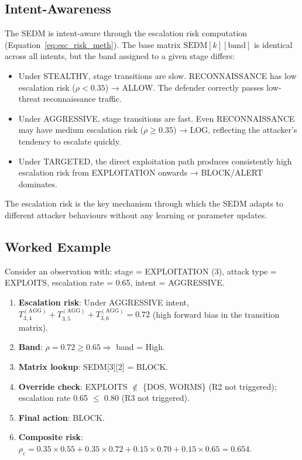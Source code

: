 \subsection{Intent-Awareness}

The SEDM is intent-aware through the escalation risk computation
(Equation~\ref{eq:esc_risk_meth}).
The base matrix $\text{SEDM}[k][\text{band}]$ is identical across all
intents, but the band assigned to a given stage differs:
%
\begin{itemize}
  \item Under STEALTHY, stage transitions are slow.
        RECONNAISSANCE has low escalation risk ($\rho < 0.35$) → ALLOW.
        The defender correctly passes low-threat reconnaissance traffic.
  \item Under AGGRESSIVE, stage transitions are fast.
        Even RECONNAISSANCE may have medium escalation risk ($\rho \geq 0.35$)
        → LOG, reflecting the attacker's tendency to escalate quickly.
  \item Under TARGETED, the direct exploitation path produces consistently
        high escalation risk from EXPLOITATION onwards → BLOCK/ALERT
        dominates.
\end{itemize}

The escalation risk is the key mechanism through which the SEDM adapts to
different attacker behaviours without any learning or parameter updates.

\subsection{Worked Example}

Consider an observation with:
stage = EXPLOITATION (3), attack type = EXPLOITS, escalation rate = 0.65,
intent = AGGRESSIVE.

\begin{enumerate}
  \item \textbf{Escalation risk}: Under AGGRESSIVE intent,
        $T^{(\text{AGG})}_{3,4} + T^{(\text{AGG})}_{3,5} + T^{(\text{AGG})}_{3,6} = 0.72$
        (high forward bias in the transition matrix).
  \item \textbf{Band}: $\rho = 0.72 \geq 0.65 \Rightarrow$ band = High.
  \item \textbf{Matrix lookup}: SEDM[3][2] = BLOCK.
  \item \textbf{Override check}:
        EXPLOITS $\notin$ \{DOS, WORMS\} (R2 not triggered);
        escalation rate 0.65 $\leq$ 0.80 (R3 not triggered).
  \item \textbf{Final action}: BLOCK.
  \item \textbf{Composite risk}:
        $\rho_c = 0.35 \times 0.55 + 0.35 \times 0.72 + 0.15 \times 0.70 + 0.15 \times 0.65 = 0.654$.
\end{enumerate}

